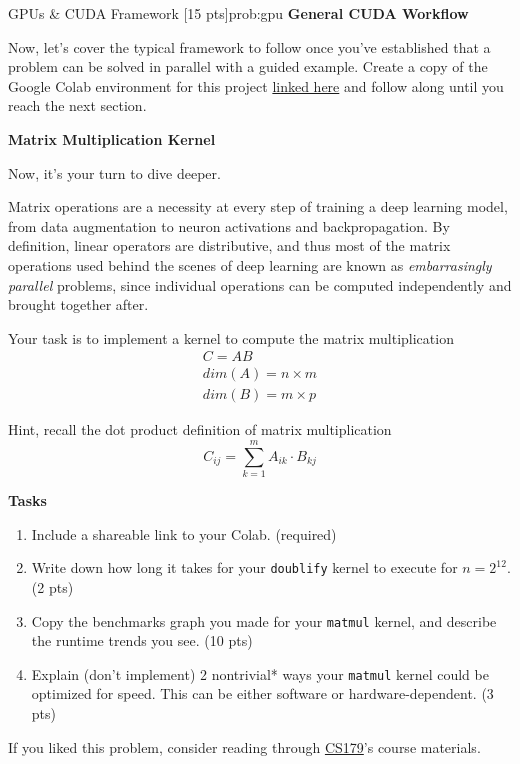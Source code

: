 \begin{problem}{GPUs \& CUDA Framework \hfill[15 pts]}{prob:gpu}
    \vspace{10px}
    \textbf{General CUDA Workflow}

    Now, let's cover the typical framework to follow once you've established that a problem can be solved in parallel with a guided example. Create a copy of the Google Colab environment for this project \href{https://colab.research.google.com/drive/1Y38N7kXJuTd-TPAA5fzQLVsc25rI9Qkc?usp=sharing}{linked here} and follow along until you reach the next section.

    \newpage
    \textbf{Matrix Multiplication Kernel}
    
    Now, it's your turn to dive deeper.
    \vspace{10px}
    
    Matrix operations are a necessity at every step of training a deep learning model, from data augmentation to neuron activations and backpropagation. By definition, linear operators are distributive, and thus most of the matrix operations used behind the scenes of deep learning are known as \textit{embarrasingly parallel} problems, since individual operations can be computed independently and brought together after.

    \vspace{10px}

    Your task is to implement a kernel to compute the matrix multiplication 
    \begin{gather*}
        C = AB \\
        dim(A) = n \times m \\
        dim(B) = m \times p
    \end{gather*}
    
    \vspace{10px}
    
    Hint, recall the dot product definition of matrix multiplication
    \[
        C_{ij} = \sum_{k=1}^{m} A_{ik} \cdot B_{kj}
    \]

    \vspace{10px}
    \textbf{Tasks}
    \begin{enumerate}
        \item Include a shareable link to your Colab. \hfill (required)
        \item Write down how long it takes for your \texttt{doublify} kernel to execute for $n=2^{12}$. \hfill (2 pts)
        \item Copy the benchmarks graph you made for your \texttt{matmul} kernel, and describe the runtime trends you see. \hfill (10 pts)
        \item Explain (don't implement) 2 nontrivial* ways your \texttt{matmul} kernel could be optimized for speed. This can be either software or hardware-dependent. \hfill (3 pts)

    \end{enumerate}

    If you liked this problem, consider reading through \href{http://courses.cms.caltech.edu/cs179/}{CS179}'s course materials.
    
    
\end{problem}


